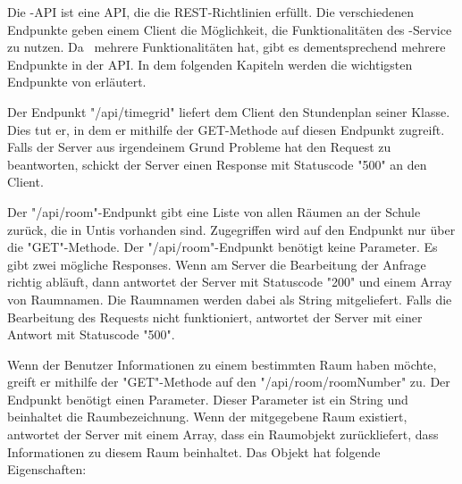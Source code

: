 \label{sec:zeliaapi}

Die \ZELIA-API ist eine API, die die REST-Richtlinien erfüllt. Die verschiedenen Endpunkte geben einem Client die Möglichkeit, die Funktionalitäten des \ZELIA-Service zu nutzen. Da \ZELIA\ mehrere Funktionalitäten hat, gibt es dementsprechend mehrere Endpunkte in der API. In dem folgenden Kapiteln werden die wichtigsten Endpunkte von \ZELIA erläutert.

Der Endpunkt "/api/timegrid" liefert dem Client den Stundenplan seiner Klasse. Dies tut er, in dem er mithilfe der GET-Methode auf diesen Endpunkt zugreift. Falls der Server aus irgendeinem Grund Probleme hat den Request zu beantworten, schickt der Server einen Response mit Statuscode "500" an den Client.


Der "/api/room"-Endpunkt gibt eine Liste von allen Räumen an der Schule zurück, die in Untis vorhanden sind. Zugegriffen wird auf den Endpunkt nur über die "GET"-Methode. Der "/api/room"-Endpunkt benötigt keine Parameter. Es gibt zwei mögliche Responses. Wenn am Server die Bearbeitung der Anfrage richtig abläuft, dann antwortet der Server mit Statuscode "200" und einem Array von Raumnamen. Die Raumnamen werden dabei als String mitgeliefert. 
Falls die Bearbeitung des Requests nicht funktioniert, antwortet der Server mit einer Antwort mit Statuscode "500".


Wenn der Benutzer Informationen zu einem bestimmten Raum haben möchte, greift er mithilfe der "GET"-Methode auf den "/api/room/{roomNumber}" zu. Der Endpunkt benötigt einen Parameter. Dieser Parameter ist ein String und beinhaltet die Raumbezeichnung.  Wenn der mitgegebene Raum existiert, antwortet der Server mit einem Array, dass ein Raumobjekt zurückliefert, dass Informationen zu diesem Raum beinhaltet. Das Objekt hat folgende Eigenschaften:

